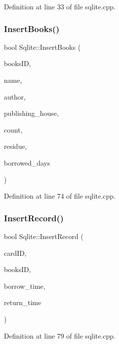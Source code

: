 Definition at line 33 of file sqlite.\+cpp.

\mbox{\label{class_sqlite_a51b44b9e10f90888b36088adb6ec6226}} 
\subsubsection{\texorpdfstring{InsertBooks()}{InsertBooks()}}
{\footnotesize\ttfamily bool Sqlite\+::\+Insert\+Books (\begin{DoxyParamCaption}\item[{Q\+String}]{books\+ID,  }\item[{Q\+String}]{name,  }\item[{Q\+String}]{author,  }\item[{Q\+String}]{publishing\+\_\+house,  }\item[{int}]{count,  }\item[{int}]{residue,  }\item[{int}]{borrowed\+\_\+days }\end{DoxyParamCaption})}



Definition at line 74 of file sqlite.\+cpp.

\mbox{\label{class_sqlite_a7271bf0e8252a9dc0969872faea228b4}} 
\subsubsection{\texorpdfstring{InsertRecord()}{InsertRecord()}}
{\footnotesize\ttfamily bool Sqlite\+::\+Insert\+Record (\begin{DoxyParamCaption}\item[{Q\+String}]{card\+ID,  }\item[{Q\+String}]{books\+ID,  }\item[{Q\+String}]{borrow\+\_\+time,  }\item[{Q\+String}]{return\+\_\+time }\end{DoxyParamCaption})}



Definition at line 79 of file sqlite.\+cpp.

\mbox{\label{class_sqlite_aaaa7d53dd288728640cde95e264f31f1}} 
